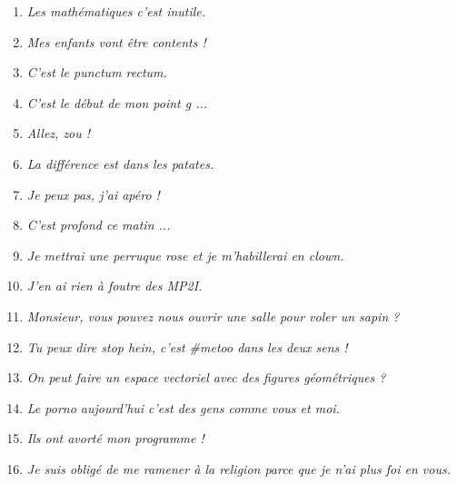     \begin{minipage}{0.60\linewidth}
        \begin{enumerate}
            \item[\bullet] \textit{Les mathématiques c'est inutile.}
            
            \item[\bullet] \textit{Mes enfants vont être contents !}
            
            \item[\bullet] \textit{C'est le punctum rectum.}
            
            \item[\bullet] \textit{C'est le début de mon point g ...}
            
            \item[\bullet] \textit{Allez, zou !}
            
            \item[\bullet] \textit{La différence est dans les patates.}
            
            \item[\bullet] \textit{Je peux pas, j'ai apéro !}
            
            \item[\bullet] \textit{C'est profond ce matin ...}
            
            \item[\bullet] \textit{Je mettrai une perruque rose et je m'habillerai en clown.}
            
            \item[\bullet] \textit{J'en ai rien à foutre des MP2I.}
            
            \item[\bullet] \textit{Monsieur, vous pouvez nous ouvrir une salle pour voler un sapin ?}
            
            \item[\bullet] \textit{Tu peux dire stop hein, c'est \#metoo dans les deux sens !}
            
            \item[\bullet] \textit{On peut faire un espace vectoriel avec des figures géométriques ?}
            
            \item[\bullet] \textit{Le porno aujourd'hui c’est des gens comme vous et moi.}
            
            \item[\bullet] \textit{Ils ont avorté mon programme !}
            
            \item[\bullet] \textit{Je suis obligé de me ramener à la religion parce que je n'ai plus foi en vous.}
        \end{enumerate}
    \end{minipage}
    
